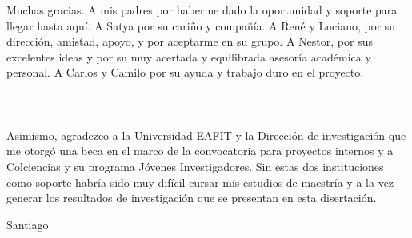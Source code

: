 


\begin{acknowledgements} 

Muchas gracias. A mis padres por haberme dado la oportunidad y soporte
para llegar hasta aquí. A Satya por su cariño y compañía. A René y Luciano, por su
dirección, amistad, apoyo, y por aceptarme en su grupo. A Nestor, por
sus excelentes ideas y por su muy acertada y equilibrada asesoría
académica y personal. A Carlos y 
Camilo por su ayuda y trabajo duro en el proyecto.\\
\\
\\
\\
Asimismo, agradezco a la Universidad EAFIT y la Dirección de
investigación que me otorgó una beca en el marco de la convocatoria
para proyectos internos y a Colciencias y su programa Jóvenes
Investigadores. Sin estas dos instituciones como soporte habría sido
muy difícil cursar mis estudios de maestría y a la vez generar los
resultados de investigación que se presentan en esta disertación. 

\begin{flushright}

Santiago

\monthname \ \the\year







\end{flushright}



\end{acknowledgements}



